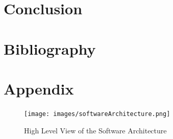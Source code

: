 \documentclass[12pt]{article}
\begin{document}
\section{Conclusion}

\newpage
\section{Bibliography}

%

\newpage
\section{Appendix}
\begin{figure}[!htb]
 \centering
 \texttt{[image: images/softwareArchitecture.png]}
 \caption{High Level View of the Software Architecture}
 \label{fig:softArch}
\end{figure}
\end{document}
